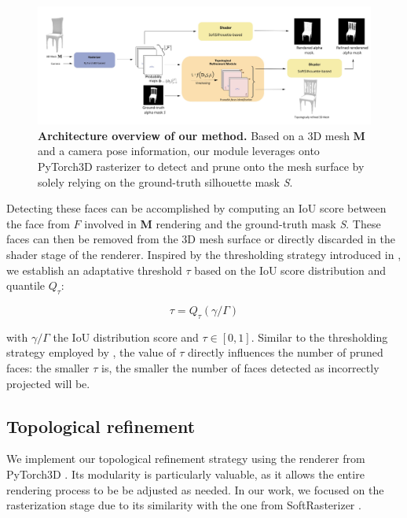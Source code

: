 \begin{figure}[htp!]
\begin{center}
\includegraphics[width=\linewidth]{images/adaptativesr/final_figure.jpg}
\end{center}
    \caption{\textbf{Architecture overview of our method.} Based on a 3D mesh \textbf{M} and a camera pose information, our module leverages onto PyTorch3D rasterizer to detect and prune onto the mesh surface by solely relying on the ground-truth silhouette mask \textit{S}.}
\label{fig:pipeline_overview}
\end{figure}

Detecting these faces can be accomplished by computing an \ac{IoU} score between the face from $F$ involved in \textbf{M} rendering and the ground-truth mask \textit{S}. These faces can then be removed from the 3D mesh surface or directly discarded in the shader stage of the renderer. Inspired by the thresholding strategy introduced in \citep{pan2019deep}, we establish an adaptative threshold $\tau$ based on the \ac{IoU} score distribution and quantile $Q_{\tau}$:

\begin{equation}
    \tau=Q_{\tau}({\gamma/\Gamma})
\end{equation}

with ${\gamma/\Gamma}$ the \ac{IoU} distribution score and $\tau \in [0,1]$. Similar to the thresholding strategy employed by \citep{pan2019deep}, the value of $\tau$ directly influences the number of pruned faces: the smaller $\tau$ is, the smaller the number of faces detected as incorrectly projected will be.

\subsection{Topological refinement}
We implement our topological refinement strategy using the renderer from PyTorch3D \citep{ravi2020accelarating}. Its modularity is particularly valuable, as it allows the entire rendering process to be  be adjusted as needed. In our work, we  focused on the rasterization stage due to its similarity with the one from SoftRasterizer \citep{liu2019soft}. 

